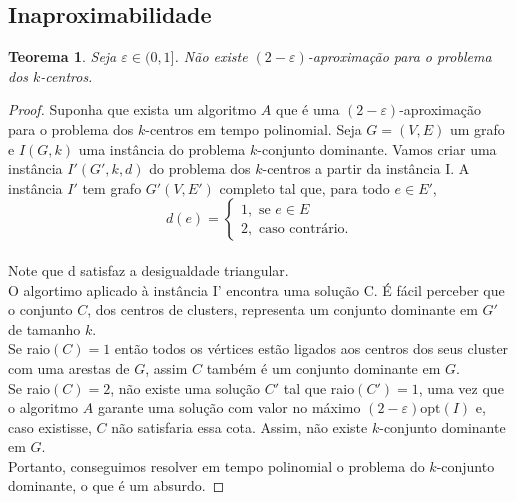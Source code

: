 \documentclass[12pt]{article}
\newcommand{\opt}{\ensuremath{\mathrm{opt}}}
\newtheorem{theorem}{Teorema}[section]
\begin{document}
\subsection{Inaproximabilidade}
\begin{theorem}
    Seja $\varepsilon \in (0,1]$. Não existe $(2-\varepsilon)$-aproximação para o problema dos $k$-centros.
\end{theorem}
\begin{proof}
    Suponha que exista um algoritmo $A$ que é uma $(2-\varepsilon)$-aproximação para o problema dos $k$-centros em tempo polinomial. Seja $G = (V,E)$ um grafo e $I(G,k)$ uma instância do problema $k$-conjunto dominante. Vamos criar uma instância $I'(G',k,d)$ do problema dos $k$-centros a partir da instância I. A instância $I'$ tem grafo $G'(V,E')$ completo tal que, para todo $e \in E'$, \\
    \[
    d(e) = \begin{cases}
            1, \text{ se } e \in E \\
            2, \text{ caso contrário.} 
            \end{cases}\]\\
    Note que d satisfaz a desigualdade triangular.\\
    O algortimo aplicado à instância I' encontra uma solução C. É fácil perceber que o conjunto $C$, dos centros de clusters, representa um conjunto dominante em $G'$ de tamanho $k$.\\
    Se raio$(C)=1$ então todos os vértices estão ligados aos centros dos seus cluster com uma arestas de $G$, assim $C$ também é um conjunto dominante em $G$. \\ 
    Se raio$(C)=2$, não existe uma solução $C'$ tal que raio$(C') = 1$, uma vez que o algoritmo $A$ garante uma solução com valor no máximo $(2-\varepsilon)\opt(I)$ e, caso existisse, $C$ não satisfaria essa cota. Assim, não existe $k$-conjunto dominante em $G$. \\ 
    Portanto, conseguimos resolver em tempo polinomial o problema do $k$-conjunto dominante, o que é um absurdo.
\end{proof}
\newpage


\end{document}
